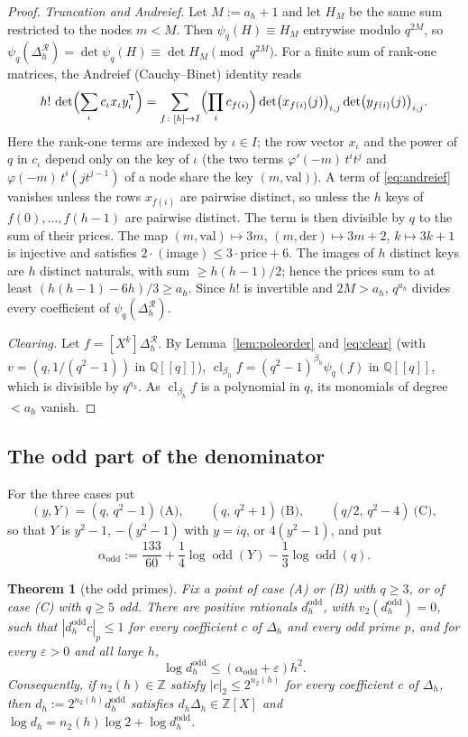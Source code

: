 \documentclass[11pt]{amsart}
\newtheorem{theorem}{Theorem}[section]
\theoremstyle{definition}
\theoremstyle{remark}
\numberwithin{equation}{section}
\newcommand{\ZZ}{\mathbb{Z}}
\newcommand{\QQ}{\mathbb{Q}}
\newcommand{\cR}{\mathcal{R}}
\newcommand{\eps}{\varepsilon}
\newcommand{\odd}{\operatorname{odd}}
\newcommand{\cl}{\operatorname{cl}}
\begin{document}
\begin{proof}
\emph{Truncation and Andreief.} Let $M:=a_h+1$ and let $H_M$ be the same sum restricted to the nodes $m<M$. Then
$\psi_q(H)\equiv H_M$ entrywise modulo $q^{2M}$, so $\psi_q(\Delta^{\cR}_h)=\det\psi_q(H)\equiv\det H_M\pmod{q^{2M}}$. For a finite
sum of rank-one matrices, the Andreief (Cauchy--Binet) identity \cite{Andreief,Forrester2019} reads
\begin{equation}\label{eq:andreief}
  h!\,\det\Bigl(\sum_\iota c_\iota x_\iota y_\iota^{\mathsf T}\Bigr)
  =\sum_{f\colon[h]\to I}\Bigl(\prod_ic_{f(i)}\Bigr)\det\bigl(x_{f(i)}(j)\bigr)_{i,j}\det\bigl(y_{f(i)}(j)\bigr)_{i,j}.
\end{equation}
Here the rank-one terms are indexed by $\iota\in I$; the row vector $x_\iota$ and the power of $q$ in $c_\iota$ depend only
on the key of $\iota$ (the two terms $\varphi'(-m)\,t^it^j$ and $\varphi(-m)\,t^i(jt^{j-1})$ of a node share the key
$(m,\mathrm{val})$). A term of \eqref{eq:andreief} vanishes unless the rows $x_{f(i)}$ are pairwise distinct, so unless
the $h$ keys of $f(0),\dots,f(h-1)$ are pairwise distinct. The term is then divisible by $q$ to the sum of their prices.
The map $(m,\mathrm{val})\mapsto3m$, $(m,\mathrm{der})\mapsto3m+2$, $k\mapsto3k+1$ is injective and satisfies
$2\cdot(\text{image})\le3\cdot\text{price}+6$. The images of $h$ distinct keys are $h$ distinct naturals, with sum
$\ge h(h-1)/2$; hence the prices sum to at least $(h(h-1)-6h)/3\ge a_h$. Since $h!$ is invertible and $2M>a_h$,
$q^{a_h}$ divides every coefficient of $\psi_q(\Delta^{\cR}_h)$.

\emph{Clearing.} Let $f=[X^k]\Delta^{\cR}_h$. By Lemma~\ref{lem:poleorder} and \eqref{eq:clear} (with $v=(q,1/(q^2-1))$ in
$\QQ[[q]]$), $\cl_{\beta_h}f=(q^2-1)^{\beta_h}\psi_q(f)$ in $\QQ[[q]]$, which is divisible by $q^{a_h}$. As
$\cl_{\beta_h}f$ is a polynomial in $q$, its monomials of degree $<a_h$ vanish.
\end{proof}

\subsection{The odd part of the denominator}
For the three cases put
\[
  (y,Y)=(q,\,q^2-1)\ \text{(A)},\qquad (q,\,q^2+1)\ \text{(B)},\qquad (q/2,\,q^2-4)\ \text{(C)},
\]
so that $Y$ is $y^2-1$, $-(y^2-1)$ with $y=iq$, or $4(y^2-1)$, and put
\[
  \alpha_{\odd}:=\frac{133}{60}+\frac14\log\odd(Y)-\frac13\log\odd(q).
\]

\begin{theorem}[the odd primes]\label{thm:oddprimes}
Fix a point of case (A) or (B) with $q\ge3$, or of case (C) with $q\ge5$ odd. There are positive rationals $d^{\odd}_h$,
with $v_2(d^{\odd}_h)=0$, such that $|d^{\odd}_hc|_p\le1$ for every coefficient $c$ of $\Delta_h$ and every odd prime $p$,
and for every $\eps>0$ and all large $h$,
\[
  \log d^{\odd}_h\le(\alpha_{\odd}+\eps)h^2 .
\]
Consequently, if $n_2(h)\in\ZZ$ satisfy $|c|_2\le2^{n_2(h)}$ for every coefficient $c$ of $\Delta_h$, then
$d_h:=2^{n_2(h)}d^{\odd}_h$ satisfies $d_h\Delta_h\in\ZZ[X]$ and $\log d_h=n_2(h)\log2+\log d^{\odd}_h$.
\end{theorem}
\end{document}
